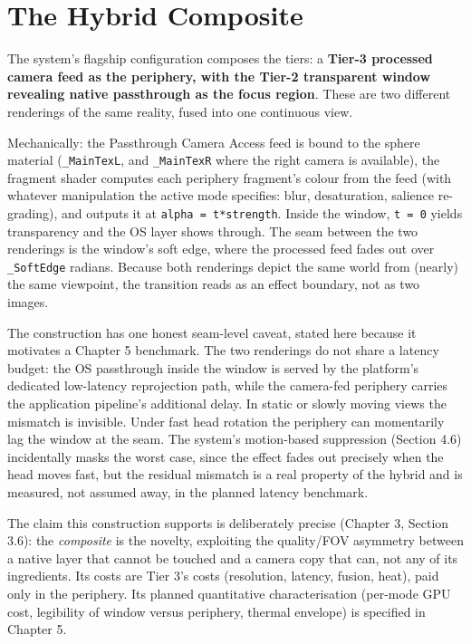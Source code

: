 \section{The Hybrid Composite}

The system's flagship configuration composes the tiers: a \textbf{Tier-3 processed camera feed as the
periphery, with the Tier-2 transparent window revealing native passthrough as the focus region}.
These are two different renderings of the same reality, fused into one continuous view.

Mechanically: the Passthrough Camera Access feed is bound to the sphere material (\verb|_MainTexL|, and
\verb|_MainTexR| where the right camera is available), the fragment shader computes each periphery
fragment's colour from the feed (with whatever manipulation the active mode specifies: blur,
desaturation, salience re-grading), and outputs it at \verb|alpha = t*strength|. Inside the window,
\verb|t = 0| yields transparency and the OS layer shows through. The seam between the two renderings is
the window's soft edge, where the processed feed fades out over \verb|_SoftEdge| radians. Because both
renderings depict the same world from (nearly) the same viewpoint, the transition reads as an effect
boundary, not as two images.

The construction has one honest seam-level caveat, stated here because it motivates a Chapter 5
benchmark. The two renderings do not share a latency budget: the OS passthrough inside the window is
served by the platform's dedicated low-latency reprojection path, while the camera-fed periphery
carries the application pipeline's additional delay. In static or slowly moving views the mismatch is
invisible. Under fast head rotation the periphery can momentarily lag the window at the seam. The
system's motion-based suppression (Section 4.6) incidentally masks the worst case, since the effect
fades out precisely when the head moves fast, but the residual mismatch is a real property of the
hybrid and is measured, not assumed away, in the planned latency benchmark.

The claim this construction supports is deliberately precise (Chapter 3, Section 3.6): the
\textit{composite} is the novelty, exploiting the quality/FOV asymmetry between a native layer that cannot
be touched and a camera copy that can, not any of its ingredients. Its costs are Tier 3's costs
(resolution, latency, fusion, heat), paid only in the periphery. Its planned quantitative
characterisation (per-mode GPU cost, legibility of window versus periphery, thermal envelope) is
specified in Chapter 5.

